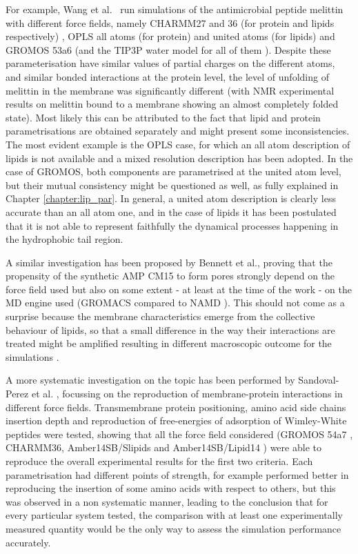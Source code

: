 For example, Wang et al.\ \cite{Wang2014} run simulations of the antimicrobial peptide melittin with different force fields, namely CHARMM27 and 36 (for protein and lipids respectively) \cite{MacKerell1998,Klauda2010}, OPLS all atoms (for protein) and united atoms (for lipids) \cite{Jorgensen1996} and GROMOS 53a6 \cite{Oostenbrink2004} (and the TIP3P water model for all of them \cite{Jorgensen1983}).
%
Despite these parameterisation have similar values of partial charges on the different atoms, and similar bonded interactions at the protein level, the level of unfolding of melittin in the membrane was significantly different (with NMR experimental results on melittin bound to a membrane showing an almost completely folded state). Most likely this can be attributed to the fact that lipid and protein parametrisations are obtained separately and might present some inconsistencies. The most evident example is the OPLS case, for which an all atom description of lipids is not available and a mixed resolution description has been adopted. In the case of GROMOS, both components are parametrised at the united atom level, but their mutual consistency might be questioned as well, as fully explained in Chapter \ref{chapter:lip_par}. In general, a united atom description is clearly less accurate than an all atom one, and in the case of lipids it has been postulated that it is not able to represent faithfully the dynamical processes happening in the hydrophobic tail region.

A similar investigation has been proposed by Bennett et al., proving that the propensity of the synthetic AMP CM15 to form pores strongly depend on the force field used but also on some extent - at least at the time of the work - on the MD engine used (GROMACS compared to NAMD \cite{Phillips2005}). This should not come as a surprise because the membrane characteristics emerge from the collective behaviour of lipids, so that a small difference in the way their interactions are treated might be amplified resulting in different macroscopic outcome for the simulations \cite{Bennett2016}.

A more systematic investigation on the topic has been performed by Sandoval-Perez et al. \cite{Sandoval-Perez2017}, focussing on the reproduction of membrane-protein interactions in different force fields. Transmembrane protein positioning, amino acid side chains insertion depth and reproduction of free-energies of adsorption of Wimley-White peptides were tested, showing that all the force field considered (GROMOS 54a7 \cite{Schmid2011}, CHARMM36, Amber14SB/Slipids \cite{Jambeck2012} and Amber14SB/Lipid14 \cite{Dickson2014}) were able to reproduce the overall experimental results for the first two criteria. Each parametrisation had different points of strength, for example performed better in reproducing the insertion of some amino acids with respect to others, but this was observed in a non systematic manner, leading to the conclusion that for every particular system tested, the comparison with at least one experimentally measured quantity would be the only way to assess the simulation performance accurately.


